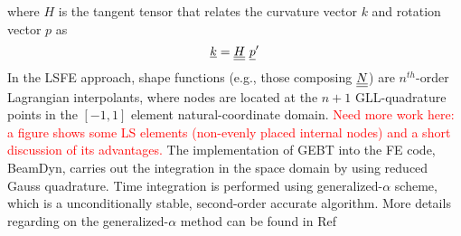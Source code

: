 where $H$ is the tangent tensor that relates the curvature vector $k$ and rotation vector $p$ as
\begin{equation}
    \label{Tensor}
    \underline{k} = \underline{\underline{H}}~ \underline{p}^\prime
\end{equation}
In the LSFE approach, shape functions (e.g., those composing $\underline{\underline{N}}$) are
$n^{th}$-order Lagrangian interpolants, where nodes are located at the $n+1$
GLL-quadrature points in the $[-1,1]$ element natural-coordinate domain.
\textcolor{red}{Need more work here: a figure shows some LS elements (non-evenly placed internal nodes) and a short discussion of its advantages.}
The implementation of GEBT into the FE code, BeamDyn, carries out the integration in the space domain by using reduced Gauss quadrature. Time integration is performed using generalized-$\alpha$ scheme, which is a unconditionally stable, second-order accurate algorithm. More details regarding on the generalized-$\alpha$ method can be found in Ref~\cite{Chung-Hulbert:1993,Bauchau:2010}


